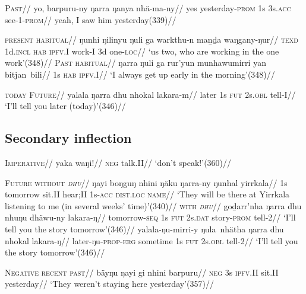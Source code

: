\documentclass[12pt]{article}
\begin{document}
\pex\begingl{}
\glpreamble\textsc{Past}//
\gla yo, barpuru-ny ŋarra ŋanya nhä-ma-ny//
\glb yes yesterday\textsc{-prom} 1s 3s.\textsc{acc} see-1-\textsc{prom}//
\glft yeah, I saw him yesterday\hfill(339)//
\endgl\xe

\pex\a\begingl{}
\glpreamble\textsc{present habitual}//
\gla ŋunhi ŋilinyu ŋuli ga warkthu-n maṉḏa waŋgany-ŋur//
\glb \textsc{texd} 1d\textsc{.incl} \textsc{hab} \textsc{ipfv.I} work-I 3d one-\textsc{loc}//
\glft`us two, who are working in the one work'\hfill(348)//\endgl
\a\begingl\glpreamble\textsc{Past habitual}//
\gla ŋarra ŋuli ga rur'yun munhawumirri yan bitjan~bili//
\glb 1s \textsc{hab} \textsc{ipfv.I}//
\glft `I always get up early in the morning'\hfill(348)//
\endgl\xe

\pex\begingl{}\glpreamble \textsc{today Future}//
\gla yalala ŋarra dhu nhokal lakara-m//
\glb later 1s \textsc{fut} 2s.\textsc{obl} tell-I//
\glft`I'll tell you later (today)'\hfill(346)//\endgl\xe

\subsection{Secondary inflection}
\pex{}\begingl\glpreamble\textsc{Imperative}//
\gla yaka waŋi!//
\glb \textsc{neg} talk.II//
\glft`don't speak!'\hfill(360)//\endgl\xe

\pex\textsc{Future}
\a\begingl\glpreamble\textsc{without \textit{dhu}}//
\gla ŋayi boŋguŋ nhini ŋäku ŋarra-ny ŋunhal yirrkala//
\glb 1s tomorrow sit.II hear;II 1s\textsc{-acc} \textsc{dist.loc} \textsc{name}//
\glft`They will be there at Yirrkala listening to me (in several weeks' time)'\hfill(340)//
\endgl
\a\begingl\glpreamble\textsc{with \textit{dhu}}//
\gla goḏarr'nha ŋarra dhu nhuŋu dhäwu-ny lakara-ŋ//
\glb tomorrow\textsc{-seq} 1s \textsc{fut} 2s\textsc{.dat} story\textsc{-prom} tell-2//
\glft`I'll tell you the story tomorrow'\hfill(346)//\endgl
\a\begingl\gla yalala-ŋu-mirri-y ŋula~nhätha ŋarra dhu nhokal lakara-ŋ//
\glb later-ŋu\textsc{-prop-erg} sometime 1s \textsc{fut} 2s\textsc{.obl} tell-2//
\glft`I'll tell you the story tomorrow'\hfill(346)//\endgl\xe

\pex\begingl{}\glpreamble \textsc{Negative recent past}//
\gla bäyŋu ŋayi gi nhini barpuru//
\glb \textsc{neg} 3s \textsc{ipfv.II} sit.II yesterday//
\glft`They weren't staying here yesterday'\hfill(357)//\endgl\xe
\end{document}
